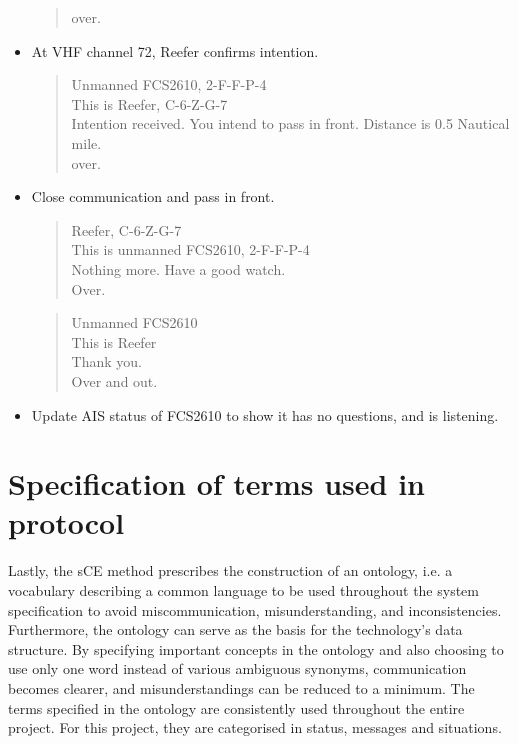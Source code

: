 \begin{itemize}
\begin{quote}
		over.
	\end{quote}
	\item At \ac{VHF} channel 72, Reefer confirms intention.
	\begin{quote}
		Unmanned FCS2610, 2-F-F-P-4 \\
		This is Reefer, C-6-Z-G-7\\
		Intention received. You intend to pass in front. Distance is 0.5 Nautical mile.\\
		over.
	\end{quote}
	\item Close communication and pass in front.
	\begin{quote}
		Reefer, C-6-Z-G-7\\
		This is unmanned FCS2610, 2-F-F-P-4 \\
		Nothing more. Have a good watch. \\
		Over.
	\end{quote}
	\begin{quote}
		Unmanned FCS2610\\
		This is Reefer\\
		Thank you. \\
		Over and out.
	\end{quote}
	\item Update AIS status of FCS2610 to show it has no questions, and is listening.
\end{itemize}

\section{Specification of terms used in protocol}
Lastly, the sCE method prescribes the construction of an ontology, i.e. a vocabulary describing a common language to be used throughout the system specification to avoid miscommunication, misunderstanding, and inconsistencies. Furthermore, the ontology can serve as the basis for the technology’s data structure. By specifying important concepts in the ontology and also choosing to use only one word instead of various ambiguous synonyms, communication becomes clearer, and misunderstandings can be reduced to a minimum. The terms specified in the ontology are consistently used throughout the entire project. For this project, they are categorised in status, messages and situations.

